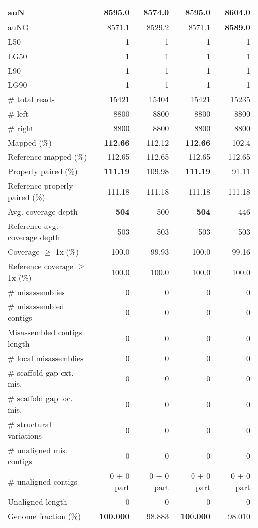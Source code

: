 \documentclass[12pt,a4paper]{article}
\begin{document}
\begin{table}[ht]
\begin{center}
\begin{tabular}{|l*{4}{|r}|}
auN & 8595.0 & 8574.0 & 8595.0 & {\bf 8604.0} \\ \hline
auNG & 8571.1 & 8529.2 & 8571.1 & {\bf 8589.0} \\ \hline
L50 & 1 & 1 & 1 & 1 \\ \hline
LG50 & 1 & 1 & 1 & 1 \\ \hline
L90 & 1 & 1 & 1 & 1 \\ \hline
LG90 & 1 & 1 & 1 & 1 \\ \hline
\# total reads & 15421 & 15404 & 15421 & 15235 \\ \hline
\# left & 8800 & 8800 & 8800 & 8800 \\ \hline
\# right & 8800 & 8800 & 8800 & 8800 \\ \hline
Mapped (\%) & {\bf 112.66} & 112.12 & {\bf 112.66} & 102.4 \\ \hline
Reference mapped (\%) & 112.65 & 112.65 & 112.65 & 112.65 \\ \hline
Properly paired (\%) & {\bf 111.19} & 109.98 & {\bf 111.19} & 91.11 \\ \hline
Reference properly paired (\%) & 111.18 & 111.18 & 111.18 & 111.18 \\ \hline
Avg. coverage depth & {\bf 504} & 500 & {\bf 504} & 446 \\ \hline
Reference avg. coverage depth & 503 & 503 & 503 & 503 \\ \hline
Coverage $\geq$ 1x (\%) & 100.0 & 99.93 & 100.0 & 99.16 \\ \hline
Reference coverage $\geq$ 1x (\%) & 100.0 & 100.0 & 100.0 & 100.0 \\ \hline
\# misassemblies & 0 & 0 & 0 & 0 \\ \hline
\# misassembled contigs & 0 & 0 & 0 & 0 \\ \hline
Misassembled contigs length & 0 & 0 & 0 & 0 \\ \hline
\# local misassemblies & 0 & 0 & 0 & 0 \\ \hline
\# scaffold gap ext. mis. & 0 & 0 & 0 & 0 \\ \hline
\# scaffold gap loc. mis. & 0 & 0 & 0 & 0 \\ \hline
\# structural variations & 0 & 0 & 0 & 0 \\ \hline
\# unaligned mis. contigs & 0 & 0 & 0 & 0 \\ \hline
\# unaligned contigs & 0 + 0 part & 0 + 0 part & 0 + 0 part & 0 + 0 part \\ \hline
Unaligned length & 0 & 0 & 0 & 0 \\ \hline
Genome fraction (\%) & {\bf 100.000} & 98.883 & {\bf 100.000} & 98.010 \\ \hline

\end{tabular}
\end{center}
\end{table}
\end{document}
